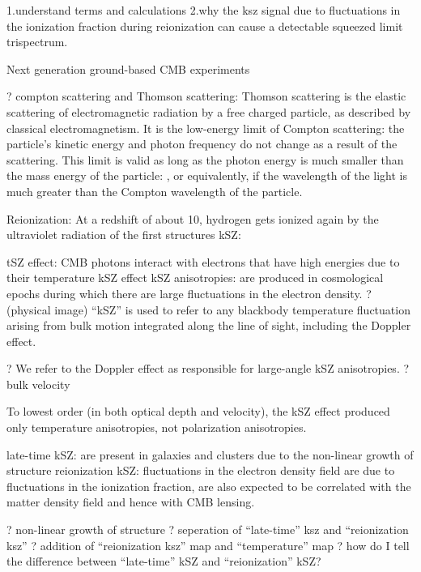 \documentclass[12pt, notitlepage, onecolumn, amsmath, amssymb, aps]{revtex4-1}
\begin{document}
1.understand terms and calculations\cite{Ferraro:2017fac} \cite{Alvarez:2015xzu}
2.why the ksz signal due to fluctuations in the ionization fraction during reionization can cause a detectable squeezed limit trispectrum.\cite{Smith:2016lnt}

 Next generation ground-based CMB 
experiments 

? compton scattering and Thomson scattering: Thomson scattering is the elastic scattering of electromagnetic radiation by a free charged particle, as described by classical electromagnetism. It is the low-energy limit of Compton scattering: the particle's kinetic energy and photon frequency do not change as a result of the scattering. This limit is valid as long as the photon energy is much smaller than the mass energy of the particle: , or equivalently, if the wavelength of the light is much greater than the Compton wavelength of the particle.

Reionization: At a redshift of about 10, hydrogen gets ionized again by the ultraviolet radiation of the first structures
kSZ: 



tSZ effect: CMB photons interact with electrons that have high energies due to their temperature
kSZ effect 
kSZ anisotropies: are produced in cosmological epochs during which there are large fluctuations in the electron density. ? (physical image)
``kSZ'' is used to refer to any blackbody temperature fluctuation arising from bulk motion integrated along the line of sight, including the Doppler effect.

? We refer to the Doppler effect as responsible for large-angle kSZ anisotropies.
? bulk velocity


To lowest order (in both optical depth and velocity), the kSZ effect produced only temperature anisotropies, not polarization anisotropies. 



late-time kSZ: are present in galaxies and clusters due to the non-linear growth of structure
reionization kSZ: fluctuations in the electron density field are due to fluctuations in the ionization fraction, are also expected to be correlated with the matter density field and hence with CMB lensing. 

? non-linear growth of structure
? seperation of ``late-time'' ksz and ``reionization ksz''
? addition of ``reionization ksz'' map and ``temperature'' map
? how do I tell the difference between ``late-time'' kSZ and ``reionization'' kSZ?
\end{document}
